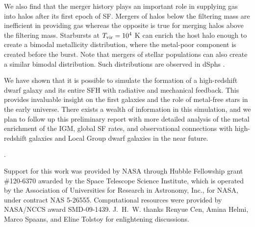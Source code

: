 \documentclass[12pt]{article}
\newcommand{\tvir}{\ifmmode{T_{\rm{vir}}}\else{$T_{\rm{vir}}$}\fi}
\newcounter{lastnote}
\newenvironment{scilastnote}{%
\setcounter{lastnote}{\value{enumiv}}%
\addtocounter{lastnote}{+1}%
\begin{list}%
{\arabic{lastnote}.}
{\setlength{\leftmargin}{.22in}}
{\setlength{\labelsep}{.5em}}}
{\end{list}}
\begin{document}
We also find that the merger history plays an important role in
supplying gas into halos after its first epoch of SF.  Mergers of
halos below the filtering mass are inefficient in providing gas
whereas the opposite is true for merging halos above the filtering
mass.  
Starbursts at $\tvir = 10^4$ K can enrich the host halo enough to
create a bimodal metallicity distribution, where the metal-poor
component is created before the burst.  Note that mergers of stellar
populations can also create a similar bimodal distribution.  Such
distributions are observed in dSphs \cite{Battaglia10}.

We have shown that it is possible to simulate the formation of a
high-redshift dwarf galaxy and its entire SFH with radiative and
mechanical feedback.  This provides invaluable insight on the first
galaxies and the role of metal-free stars in the early universe.
There exists a wealth of information in this simulation, and we plan
to follow up this preliminary report with more detailed analysis of
the metal enrichment of the IGM, global SF rates, and observational
connections with high-redshift galaxies and Local Group dwarf galaxies
in the near future.





\begin{scilastnote}
\item Support for this work was provided by NASA through Hubble Fellowship
grant \#120-6370 awarded by the Space Telescope Science Institute,
which is operated by the Association of Universities for Research in
Astronomy, Inc., for NASA, under contract NAS 5-26555.  Computational
resources were provided by NASA/NCCS award SMD-09-1439.
J.~H.~W. thanks Renyue Cen, Amina Helmi, Marco Spaans, and Eline
Tolstoy for enlightening discussions.
\end{scilastnote}
\end{document}
